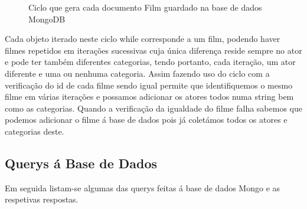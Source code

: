 \begin{itemize}
\begin{figure}[H]
  \caption {Ciclo que gera cada documento Film guardado na base de dados MongoDB}

  \label {fig1}

\end{figure}

Cada objeto iterado neste ciclo while corresponde a um film, podendo haver filmes repetidos em iterações sucessivas cuja única diferença reside sempre no ator e pode ter também diferentes categorias, tendo portanto, cada iteração, um ator diferente e uma ou nenhuma categoria. Assim fazendo uso do ciclo com a verificação do id de cada filme sendo igual permite que identifiquemos o mesmo filme em várias iterações e possamos adicionar os atores todos numa string bem como as categorias. Quando a verificação da igualdade do filme falha sabemos que podemos adicionar o filme á base de dados pois já coletámos todos os atores e categorias deste.

\end{itemize}
\subsection{Querys á Base de Dados}

Em seguida listam-se algumas das querys feitas á base de dados Mongo e as respetivas respostas.

